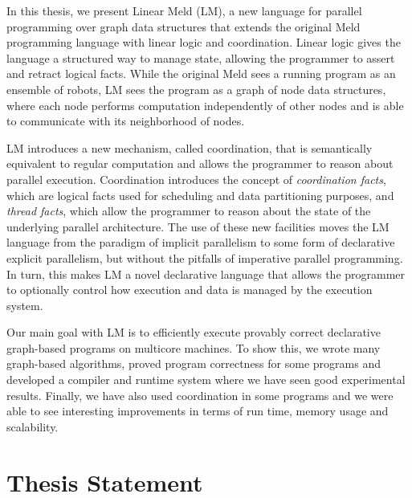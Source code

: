 In this thesis, we present Linear Meld (LM), a new language for parallel
programming over graph data structures that extends the original Meld
programming language with linear logic and coordination. Linear logic gives the
language a structured way to manage state, allowing the programmer to assert and
retract logical facts.  While the original Meld sees a running program as an
ensemble of robots, LM sees the program as a graph of node data structures,
where each node performs computation independently of other nodes and is able to
communicate with its neighborhood of nodes.

LM introduces a new mechanism, called coordination, that is semantically
equivalent to regular computation and allows the programmer to reason about
parallel execution. Coordination introduces the concept of \emph{coordination
facts}, which are logical facts used for scheduling and data partitioning
purposes, and \emph{thread facts}, which allow the programmer to reason about
the state of the underlying parallel architecture. The use of these new
facilities moves the LM language from the paradigm of implicit parallelism to
some form of declarative explicit parallelism, but without the pitfalls of
imperative parallel programming. In turn, this makes LM a novel declarative
language that allows the programmer to optionally control how execution and data
is managed by the execution system.

Our main goal with LM is to efficiently execute provably correct declarative
graph-based programs on multicore machines. To show this, we wrote many
graph-based algorithms, proved program correctness for some programs and
developed a compiler and runtime system where we have seen good experimental
results. Finally, we have also used coordination in some programs and we were
able to see interesting improvements in terms of run time, memory usage and
scalability.

\section{Thesis Statement}



